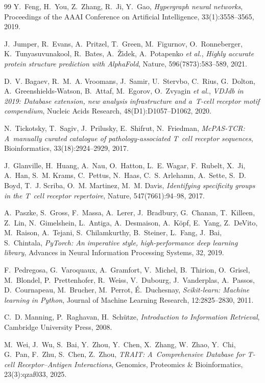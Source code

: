 \documentclass{SGGW-thesis}
\begin{document}
\begin{thebibliography}{99}
Y.~Feng, H.~You, Z.~Zhang, R.~Ji, Y.~Gao,
\textit{Hypergraph neural networks},
Proceedings of the AAAI Conference on Artificial Intelligence, 33(1):3558--3565, 2019.

J.~Jumper, R.~Evans, A.~Pritzel, T.~Green, M.~Figurnov, O.~Ronneberger,
K.~Tunyasuvunakool, R.~Bates, A.~{\v{Z}}{\'\i}dek, A.~Potapenko \textit{et al.},
\textit{Highly accurate protein structure prediction with {AlphaFold}},
Nature, 596(7873):583--589, 2021.

D.~V. Bagaev, R.~M.~A. Vroomans, J.~Samir, U.~Stervbo, C.~Rius, G.~Dolton,
A.~Greenshields-Watson, B.~Attaf, M.~Egorov, O.~Zvyagin \textit{et al.},
\textit{{VDJdb} in 2019: Database extension, new analysis infrastructure and a~T-cell
receptor motif compendium},
Nucleic Acids Research, 48(D1):D1057--D1062, 2020.

N.~Tickotsky, T.~Sagiv, J.~Prilusky, E.~Shifrut, N.~Friedman,
\textit{McPAS-TCR: A~manually curated catalogue of pathology-associated T~cell receptor
sequences},
Bioinformatics, 33(18):2924--2929, 2017.

J.~Glanville, H.~Huang, A.~Nau, O.~Hatton, L.~E. Wagar, F.~Rubelt, X.~Ji, A.~Han,
S.~M. Krams, C.~Pettus, N.~Haas, C.~S. Arlehamn, A.~Sette, S.~D. Boyd, T.~J. Scriba,
O.~M. Martinez, M.~M. Davis,
\textit{Identifying specificity groups in the T~cell receptor repertoire},
Nature, 547(7661):94--98, 2017.

A.~Paszke, S.~Gross, F.~Massa, A.~Lerer, J.~Bradbury, G.~Chanan, T.~Killeen, Z.~Lin,
N.~Gimelshein, L.~Antiga, A.~Desmaison, A.~K{\"o}pf, E.~Yang, Z.~DeVito, M.~Raison,
A.~Tejani, S.~Chilamkurthy, B.~Steiner, L.~Fang, J.~Bai, S.~Chintala,
\textit{PyTorch: An imperative style, high-performance deep learning library},
Advances in Neural Information Processing Systems, 32, 2019.

F.~Pedregosa, G.~Varoquaux, A.~Gramfort, V.~Michel, B.~Thirion, O.~Grisel, M.~Blondel,
P.~Prettenhofer, R.~Weiss, V.~Dubourg, J.~Vanderplas, A.~Passos, D.~Cournapeau,
M.~Brucher, M.~Perrot, {\'E}.~Duchesnay,
\textit{Scikit-learn: Machine learning in {Python}},
Journal of Machine Learning Research, 12:2825--2830, 2011.

C.~D. Manning, P.~Raghavan, H.~Sch{\"u}tze,
\textit{Introduction to Information Retrieval},
Cambridge University Press, 2008.

M.~Wei, J.~Wu, S.~Bai, Y.~Zhou, Y.~Chen, X.~Zhang, W.~Zhao, Y.~Chi, G.~Pan, F.~Zhu, S.~Chen, Z.~Zhou,
\textit{TRAIT: A~Comprehensive Database for T-cell Receptor--Antigen Interactions},
Genomics, Proteomics \& Bioinformatics, 23(3):qzaf033, 2025.

\end{thebibliography}

\beforelastpage
\end{document}
